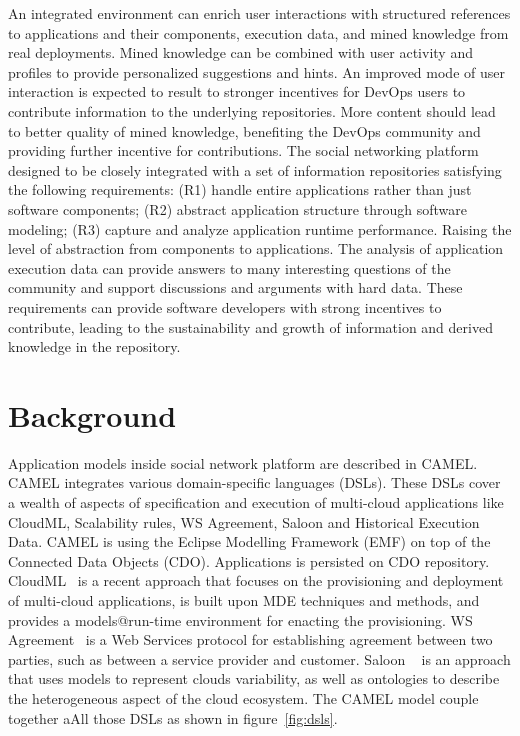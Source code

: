 An integrated environment can enrich user interactions with structured references to applications and their components, execution data, and mined knowledge from real deployments. Mined knowledge can be combined with user activity and profiles to provide personalized suggestions and hints.  An improved mode of user interaction is expected to result to stronger incentives for DevOps users to contribute information to the underlying repositories. More content should lead to better quality of mined knowledge, benefiting the DevOps community and providing further incentive for contributions.  The social networking platform designed to be closely integrated with a set of information repositories satisfying the following requirements: 
(R1) handle entire applications rather than just software components; (R2) abstract application structure through software modeling; (R3) capture and analyze application runtime performance. Raising the level of abstraction from components to applications. The analysis of application execution data can provide answers to many interesting questions of the community and support discussions and arguments with hard data. 
These requirements can provide software developers with strong incentives to contribute, leading to the sustainability and growth of information and derived knowledge in the repository.



\section{Background}
Application models inside social network platform are described in CAMEL. CAMEL integrates various domain-specific languages (DSLs). These DSLs cover a wealth of aspects of specification and execution of multi-cloud applications like CloudML, Scalability rules, WS Agreement, Saloon and Historical Execution Data. CAMEL is using the Eclipse Modelling Framework (EMF) on top of the Connected Data Objects (CDO). Applications is persisted on CDO repository.
CloudML~\cite{FerryRossiniCMS13} is a recent approach that focuses on the provisioning and deployment of multi-cloud applications, is built upon MDE techniques and methods, and provides a models@run-time environment for enacting the provisioning.  WS Agreement~\cite{andrieux2007web} is a Web Services protocol for establishing agreement between two parties, such as between a service provider and customer. Saloon ~\cite{quinton2013towards} is an approach that uses models to represent clouds variability, as well as ontologies to describe the heterogeneous aspect of the cloud ecosystem. The CAMEL model couple together aAll those DSLs as shown in figure~\ref{fig:dsls}.

